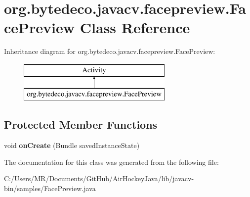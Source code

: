 \hypertarget{classorg_1_1bytedeco_1_1javacv_1_1facepreview_1_1_face_preview}{}\section{org.\+bytedeco.\+javacv.\+facepreview.\+Face\+Preview Class Reference}
\label{classorg_1_1bytedeco_1_1javacv_1_1facepreview_1_1_face_preview}
Inheritance diagram for org.\+bytedeco.\+javacv.\+facepreview.\+Face\+Preview\+:\begin{figure}[H]
\begin{center}
\leavevmode
\includegraphics[height=2.000000cm]{classorg_1_1bytedeco_1_1javacv_1_1facepreview_1_1_face_preview}
\end{center}
\end{figure}
\subsection*{Protected Member Functions}
\begin{DoxyCompactItemize}
\item 
\hypertarget{classorg_1_1bytedeco_1_1javacv_1_1facepreview_1_1_face_preview_ab4e7327c29cbda3177d58a225384b542}{}void {\bfseries on\+Create} (Bundle saved\+Instance\+State)\label{classorg_1_1bytedeco_1_1javacv_1_1facepreview_1_1_face_preview_ab4e7327c29cbda3177d58a225384b542}

\end{DoxyCompactItemize}


The documentation for this class was generated from the following file\+:\begin{DoxyCompactItemize}
\item 
C\+:/\+Users/\+M\+R/\+Documents/\+Git\+Hub/\+Air\+Hockey\+Java/lib/javacv-\/bin/samples/Face\+Preview.\+java\end{DoxyCompactItemize}
